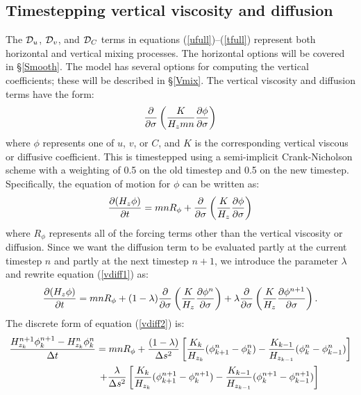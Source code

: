 \subsection{Timestepping vertical viscosity and diffusion}
\label{Vfric}
The ${\cal D}_u$, ${\cal D}_v$, and ${\cal D}_C$ terms in
equations (\ref{ufull})--(\ref{tfull}) represent both horizontal and
vertical mixing processes.  The horizontal options will be covered in
\S\ref{Smooth}. The model has several options for computing the
vertical coefficients; these will be described in \S\ref{Vmix}.
The vertical viscosity and diffusion terms have
the form:
\begin{equation}
   {\partial \over \partial \sigma} \left( {K \over H_z mn} {\partial
   \phi \over \partial \sigma} \right)
\end{equation}
where $\phi$ represents one of $u$, $v$, or $C$, and $K$ is the
corresponding vertical viscous or diffusive coefficient. This is
timestepped using a semi-implicit Crank-Nicholson scheme with a
weighting of 0.5 on the old timestep and 0.5 on the new timestep.
Specifically, the equation of motion for $\phi$
can be written as:
\begin{equation}
  {\partial (H_z \phi) \over \partial t} = mnR_{\phi} +
  {\partial \over \partial \sigma} \left( {K \over H_z}
  {\partial \phi \over \partial \sigma} \right)
\label{vdiff1}
\end{equation}
where $R_{\phi}$ represents all of the forcing terms other than the
vertical viscosity or diffusion.  Since we want the diffusion term
to be evaluated partly at the current timestep $n$ and partly at the
next timestep $n+1$, we introduce the parameter $\lambda$ and rewrite
equation (\ref{vdiff1}) as:
\begin{equation}
  {\partial (H_z \phi) \over \partial t} = mnR_{\phi} +
  (1-\lambda) {\partial \over \partial \sigma} \left( {K \over H_z}
  {\partial \phi^n \over \partial \sigma} \right) +
  \lambda {\partial \over \partial \sigma} \left( {K \over H_z}
  {\partial \phi^{n+1} \over \partial \sigma} \right) .
\label{vdiff2}
\end{equation}
The discrete form of equation (\ref{vdiff2}) is:
\begin{multline}
   {H_{z_k}^{n+1} \phi_k^{n+1} - H_{z_k}^n \phi_k^n \over \Delta t} =
   mn R_{\phi} + {(1-\lambda) \over \Delta s^2} \left[
   {K_k \over H_{z_k}} (\phi_{k+1}^n - \phi_k^n) -
   {K_{k-1} \over H_{z_{k-1}}} (\phi_k^n - \phi_{k-1}^n) \right]
\\ \vspace{1mm}
 \qquad \qquad \qquad  + {\lambda \over \Delta s^2} \left[
   {K_k \over H_{z_k}} (\phi_{k+1}^{n+1} - \phi_k^{n+1}) -
   {K_{k-1} \over H_{z_{k-1}}} (\phi_k^{n+1} - \phi_{k-1}^{n+1})
   \right]
\label{vdiff3}
\end{multline}
